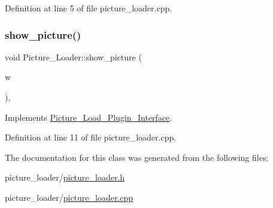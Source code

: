 Definition at line 5 of file picture\+\_\+loader.\+cpp.

\mbox{\label{classPicture__Loader_af4127aaea7066112b2368adda46a82b0}} 
\subsubsection{\texorpdfstring{show\+\_\+picture()}{show\_picture()}}
{\footnotesize\ttfamily void Picture\+\_\+\+Loader\+::show\+\_\+picture (\begin{DoxyParamCaption}\item[{Q\+Main\+Window $\ast$}]{w }\end{DoxyParamCaption})\hspace{0.3cm}{\ttfamily [override]}, {\ttfamily [virtual]}}



Implements \hyperlink{classPicture__Load__Plugin__Interface_a2d90e62b277854046ebcdac8ffadf0d5}{Picture\+\_\+\+Load\+\_\+\+Plugin\+\_\+\+Interface}.



Definition at line 11 of file picture\+\_\+loader.\+cpp.



The documentation for this class was generated from the following files\+:\begin{DoxyCompactItemize}
\item 
picture\+\_\+loader/\hyperlink{picture__loader_8h}{picture\+\_\+loader.\+h}\item 
picture\+\_\+loader/\hyperlink{picture__loader_8cpp}{picture\+\_\+loader.\+cpp}\end{DoxyCompactItemize}
